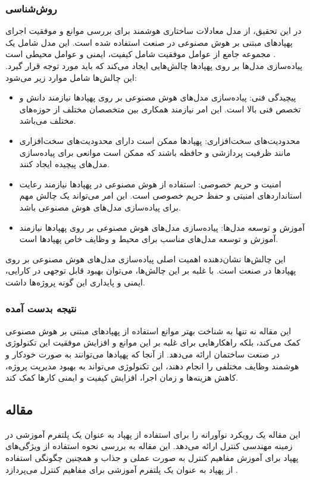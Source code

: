 \subsubsection{روش‌شناسی}
در این تحقیق، از مدل معادلات ساختاری هوشمند برای بررسی موانع و موفقیت اجرای پهپادهای مبتنی بر هوش مصنوعی در صنعت استفاده شده است.
این مدل شامل یک مجموعه جامع از عوامل موفقیت شامل کیفیت، ایمنی و عوامل محیطی است .
\\
پیاده‌سازی مدل‌ها بر روی پهپادها چالش‌هایی ایجاد می‌کند که باید مورد توجه قرار گیرد. این چالش‌ها شامل موارد زیر می‌شود:
\begin{itemize}
    \item پیچیدگی فنی: پیاده‌سازی مدل‌های هوش مصنوعی بر روی پهپادها نیازمند دانش و تخصص فنی بالا است. این امر نیازمند همکاری بین متخصصان مختلف از حوزه‌های مختلف می‌باشد.
    \item محدودیت‌های سخت‌افزاری: پهپادها ممکن است دارای محدودیت‌های سخت‌افزاری مانند ظرفیت پردازشی و حافظه باشند که ممکن است موانعی برای پیاده‌سازی مدل‌های پیچیده ایجاد کنند.
    \item امنیت و حریم خصوصی: استفاده از هوش مصنوعی در پهپادها نیازمند رعایت استانداردهای امنیتی و حفظ حریم خصوصی است. این امر می‌تواند یک چالش مهم برای پیاده‌سازی مدل‌های هوش مصنوعی باشد.
    \item آموزش و توسعه مدل‌ها: پیاده‌سازی مدل‌های هوش مصنوعی بر روی پهپادها نیازمند آموزش و توسعه مدل‌های مناسب برای محیط و وظایف خاص پهپادها است.
\end{itemize}
این چالش‌ها نشان‌دهنده اهمیت اصلی پیاده‌سازی مدل‌های هوش مصنوعی بر روی پهپادها در صنعت است. با غلبه بر این چالش‌ها، می‌توان بهبود 
قابل توجهی در کارایی، ایمنی و پایداری این گونه پروژه‌‌ها داشت.

\subsubsection{نتیجه بدست آمده}
این مقاله نه تنها به شناخت بهتر موانع استفاده از پهپادهای مبتنی بر هوش مصنوعی کمک می‌کند، بلکه راهکارهایی برای غلبه بر این موانع و افزایش موفقیت این تکنولوژی در صنعت ساختمان ارائه می‌دهد. از آنجا که
پهپادها می‌توانند به صورت خودکار و هوشمند وظایف مختلفی را انجام دهند، این تکنولوژی می‌تواند به بهبود مدیریت پروژه، کاهش هزینه‌ها و زمان اجرا، افزایش کیفیت و ایمنی کارها کمک کند.


\subsection{مقاله }
این مقاله یک رویکرد نوآورانه را برای استفاده از پهپاد  به عنوان یک پلتفرم آموزشی در زمینه مهندسی کنترل ارائه می‌دهد. این مقاله به بررسی نحوه استفاده از ویژگی‌های پهپاد برای 
آموزش مفاهیم کنترل به صورت عملی و جذاب و همچنین چگونگی استفاده از پهپاد  به عنوان یک پلتفرم آموزشی برای مفاهیم کنترل می‌پردازد \cite{ghazi2023use}.

